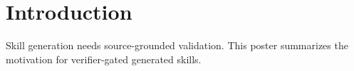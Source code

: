\section{Introduction}
Skill generation needs source-grounded validation. This poster summarizes the motivation for verifier-gated generated skills.
